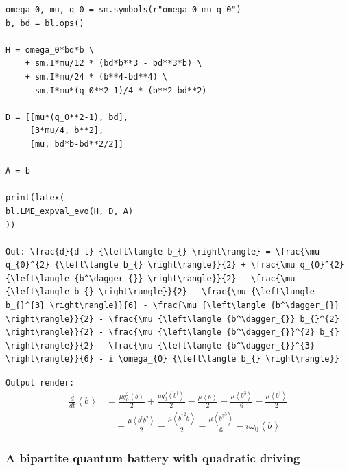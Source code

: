 \documentclass[5p, twocolumn, 10pt, sort&compress]{elsarticle}
\newcommand{\inlinecode}[1]{\texttt{#1}}
\newenvironment{revision2}{%
\color{red}
}
{}
\begin{document}
\begin{verbatim}
omega_0, mu, q_0 = sm.symbols(r"omega_0 mu q_0")
b, bd = bl.ops()

H = omega_0*bd*b \
    + sm.I*mu/12 * (bd*b**3 - bd**3*b) \
    + sm.I*mu/24 * (b**4-bd**4) \
    - sm.I*mu*(q_0**2-1)/4 * (b**2-bd**2)

D = [[mu*(q_0**2-1), bd],
     [3*mu/4, b**2],
     [mu, bd*b-bd**2/2]]

A = b

print(latex(
bl.LME_expval_evo(H, D, A)
))

Out: \frac{d}{d t} {\left\langle b_{} \right\rangle} = \frac{\mu q_{0}^{2} {\left\langle b_{} \right\rangle}}{2} + \frac{\mu q_{0}^{2} {\left\langle {b^\dagger_{}} \right\rangle}}{2} - \frac{\mu {\left\langle b_{} \right\rangle}}{2} - \frac{\mu {\left\langle b_{}^{3} \right\rangle}}{6} - \frac{\mu {\left\langle {b^\dagger_{}} \right\rangle}}{2} - \frac{\mu {\left\langle {b^\dagger_{}} b_{}^{2} \right\rangle}}{2} - \frac{\mu {\left\langle {b^\dagger_{}}^{2} b_{} \right\rangle}}{2} - \frac{\mu {\left\langle {b^\dagger_{}}^{3} \right\rangle}}{6} - i \omega_{0} {\left\langle b_{} \right\rangle}}
\end{verbatim}
\begin{revision2}
\noindent\inlinecode{Output render:}
\begin{align*}
\frac{d}{d t} {\left\langle b_{} \right\rangle} &= \frac{\mu q_{0}^{2} {\left\langle b_{} \right\rangle}}{2} + \frac{\mu q_{0}^{2} {\left\langle {b^\dagger_{}} \right\rangle}}{2} - \frac{\mu {\left\langle b_{} \right\rangle}}{2} - \frac{\mu {\left\langle b_{}^{3} \right\rangle}}{6} - \frac{\mu {\left\langle {b^\dagger_{}} \right\rangle}}{2} \\ &\quad - \frac{\mu {\left\langle {b^\dagger_{}} b_{}^{2} \right\rangle}}{2} - \frac{\mu {\left\langle {b^\dagger_{}}^{2} b_{} \right\rangle}}{2} - \frac{\mu {\left\langle {b^\dagger_{}}^{3} \right\rangle}}{6} - i \omega_{0} {\left\langle b_{} \right\rangle}
\end{align*}
\end{revision2}

\subsubsection{A bipartite quantum battery with quadratic driving}
\end{document}
